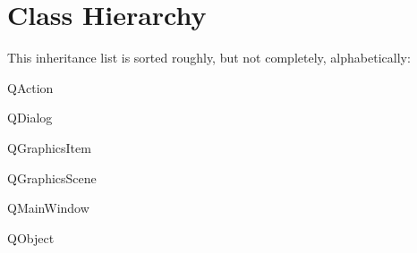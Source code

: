 \section{Class Hierarchy}
This inheritance list is sorted roughly, but not completely, alphabetically\+:\begin{DoxyCompactList}
\item {}
\item {}
\item {}
\item Q\+Action\begin{DoxyCompactList}
\item {}
\end{DoxyCompactList}
\item Q\+Dialog\begin{DoxyCompactList}
\item {}
\end{DoxyCompactList}
\item Q\+Graphics\+Item\begin{DoxyCompactList}
\item {}
\begin{DoxyCompactList}
\item {}
\end{DoxyCompactList}
\end{DoxyCompactList}
\item Q\+Graphics\+Scene\begin{DoxyCompactList}
\item {}
\end{DoxyCompactList}
\item Q\+Main\+Window\begin{DoxyCompactList}
\item {}
\end{DoxyCompactList}
\item Q\+Object\begin{DoxyCompactList}
\item {}

\end{DoxyCompactList}
\end{DoxyCompactList}

